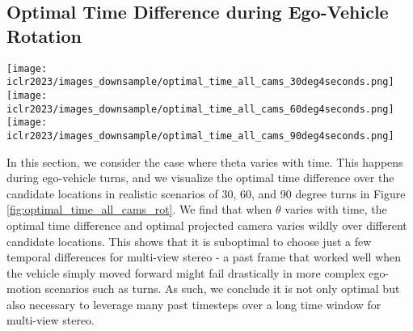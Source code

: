 \documentclass[runningheads, hyperfootnotes=false]{article}
\begin{document}
\subsection{Optimal Time Difference during Ego-Vehicle Rotation}\label{app:theory_turns}
\begin{figure*}[t]
  \centering
  \texttt{[image: iclr2023/images\_downsample/optimal\_time\_all\_cams\_30deg4seconds.png]}
  \texttt{[image: iclr2023/images\_downsample/optimal\_time\_all\_cams\_60deg4seconds.png]}
  \texttt{[image: iclr2023/images\_downsample/optimal\_time\_all\_cams\_90deg4seconds.png]}
  \captionsetup{aboveskip=0pt}\captionsetup{belowskip=0pt}\caption{Visualization of the optimal time difference for every candidate location when the ego-vehicle turns 30, 60, or 90 degrees over the first 8 timesteps.}
  \label{fig:optimal_time_all_cams_rot}
\end{figure*} In this section, we consider the case where theta varies with time. This happens during ego-vehicle turns, and we visualize the optimal time difference over the candidate locations in realistic scenarios of 30, 60, and 90 degree turns in Figure \ref{fig:optimal_time_all_cams_rot}. We find that when $\theta$ varies with time, the optimal time difference and optimal projected camera varies wildly over different candidate locations. This shows that it is suboptimal to choose just a few temporal differences for multi-view stereo - a past frame that worked well when the vehicle simply moved forward might fail drastically in more complex ego-motion scenarios such as turns. As such, we conclude it is not only optimal but also necessary to leverage many past timesteps over a long time window for multi-view stereo.
\end{document}
